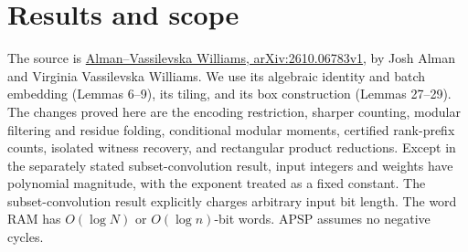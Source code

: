 \documentclass[11pt]{article}
\newcommand{\paper}{\href{https://arxiv.org/html/2610.06783v1}{Alman--Vassilevska Williams, arXiv:2610.06783v1}}
\begin{document}
\section{Results and scope}
The source is \paper, by Josh Alman and Virginia Vassilevska Williams.
We use its algebraic identity and batch embedding (Lemmas 6--9), its tiling,
and its box construction (Lemmas 27--29). The changes proved here are the
encoding restriction, sharper counting, modular filtering and residue
folding, conditional modular moments, certified rank-prefix counts,
isolated witness recovery, and rectangular product reductions.
Except in the separately stated subset-convolution result, input integers
and weights have polynomial magnitude, with the exponent treated as a fixed
constant. The subset-convolution result explicitly charges arbitrary input
bit length. The word RAM has $O(\log N)$ or $O(\log n)$-bit
words. APSP assumes no negative cycles.
\end{document}
